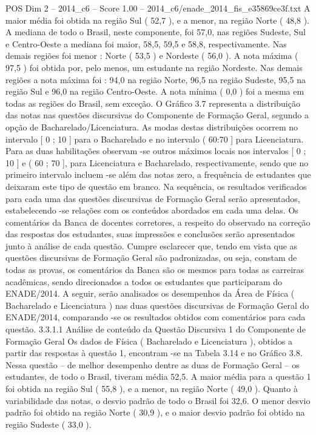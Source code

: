 \begin{textsample}{POS Dim 2 – 2014\_c6 – Score 1.00 – 2014\_c6/enade\_2014\_fis\_e35869ce3f.txt}
A maior média foi obtida na região Sul ( 52,7 ), e a menor, na região Norte ( 48,8 ).
A mediana de todo o Brasil, neste componente, foi 57,0, nas regiões Sudeste, Sul e Centro-Oeste a mediana foi maior, 58,5, 59,5 e 58,8, respectivamente.
Nas demais regiões foi menor : Norte ( 53,5 ) e Nordeste ( 56,0 ).
A nota máxima ( 97,5 ) foi obtida por, pelo menos, um estudante na região Nordeste.
Nas demais regiões a nota máxima foi : 94,0 na região Norte, 96,5 na região Sudeste, 95,5 na região Sul e 96,0 na região Centro-Oeste.
A nota mínima ( 0,0 ) foi a mesma em todas as regiões do Brasil, sem exceção.
O Gráfico 3.7 representa a distribuição das notas nas questões discursivas do Componente de Formação Geral, segundo a opção de Bacharelado/Licenciatura.
As modas destas distribuições ocorrem no intervalo [ 0 ; 10 ] para o Bacharelado e no intervalo ( 60:70 ] para Licenciatura.
Para as duas habilitações observam -se outros máximos locais nos intervalos [ 0 ; 10 ] e ( 60 ; 70 ], para Licenciatura e Bacharelado, respectivamente, sendo que no primeiro intervalo incluem -se além das notas zero, a frequência de estudantes que deixaram este tipo de questão em branco.
Na sequência, os resultados verificados para cada uma das questões discursivas de Formação Geral serão apresentados, estabelecendo -se relações com os conteúdos abordados em cada uma delas.
Os comentários da Banca de docentes corretores, a respeito do observado na correção das respostas dos estudantes, suas impressões e conclusões serão apresentados junto à análise de cada questão.
Cumpre esclarecer que, tendo em vista que as questões discursivas de Formação Geral são padronizadas, ou seja, constam de todas as provas, os comentários da Banca são os mesmos para todas as carreiras acadêmicas, sendo direcionados a todos os estudantes que participaram do ENADE/2014.
A seguir, serão analisados os desempenhos da Área de Física ( Bacharelado e Licenciatura ) nas duas questões discursivas de Formação Geral do ENADE/2014, comparando -se os resultados obtidos com comentários para cada questão. 3.3.1.1 Análise de conteúdo da Questão Discursiva 1 do Componente de Formação Geral Os dados de Física ( Bacharelado e Licenciatura ), obtidos a partir das respostas à questão 1, encontram -se na Tabela 3.14 e no Gráfico 3.8.
Nessa questão – de melhor desempenho dentre as duas de Formação Geral – os estudantes, de todo o Brasil, tiveram média 52,5.
A maior média para a questão 1 foi obtida na região Sul ( 55,8 ), e a menor, na região Norte ( 49,0 ).
Quanto à variabilidade das notas, o desvio padrão de todo o Brasil foi 32,6.
O menor desvio padrão foi obtido na região Norte ( 30,9 ), e o maior desvio padrão foi obtido na região Sudeste ( 33,0 ).

\end{textsample}
